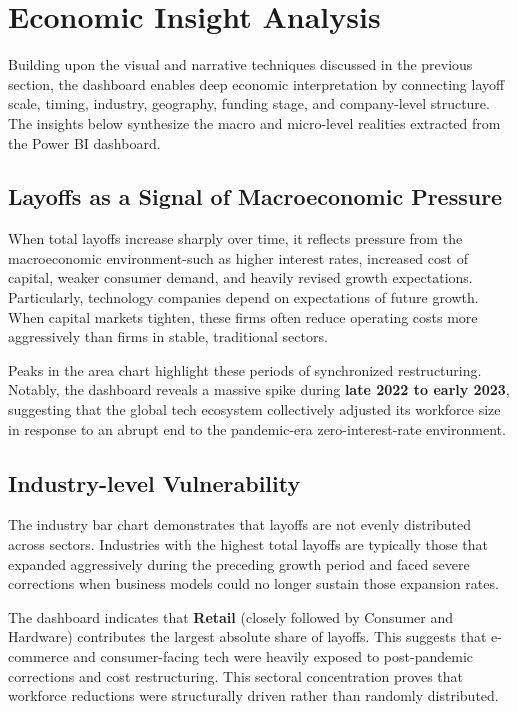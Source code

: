 \documentclass[a4paper,12pt]{article}
\begin{document}
\section{Economic Insight Analysis}
Building upon the visual and narrative techniques discussed in the previous section, the dashboard enables deep economic interpretation by connecting layoff scale, timing, industry, geography, funding stage, and company-level structure. The insights below synthesize the macro and micro-level realities extracted from the Power BI dashboard.

\subsection{Layoffs as a Signal of Macroeconomic Pressure}
When total layoffs increase sharply over time, it reflects pressure from the macroeconomic environment-such as higher interest rates, increased cost of capital, weaker consumer demand, and heavily revised growth expectations. Particularly, technology companies depend on expectations of future growth. When capital markets tighten, these firms often reduce operating costs more aggressively than firms in stable, traditional sectors. 

Peaks in the area chart highlight these periods of synchronized restructuring. Notably, the dashboard reveals a massive spike during \textbf{late 2022 to early 2023}, suggesting that the global tech ecosystem collectively adjusted its workforce size in response to an abrupt end to the pandemic-era zero-interest-rate environment.

\subsection{Industry-level Vulnerability}
The industry bar chart demonstrates that layoffs are not evenly distributed across sectors. Industries with the highest total layoffs are typically those that expanded aggressively during the preceding growth period and faced severe corrections when business models could no longer sustain those expansion rates.

The dashboard indicates that \textbf{Retail} (closely followed by Consumer and Hardware) contributes the largest absolute share of layoffs. This suggests that e-commerce and consumer-facing tech were heavily exposed to post-pandemic corrections and cost restructuring. This sectoral concentration proves that workforce reductions were structurally driven rather than randomly distributed.
\end{document}
